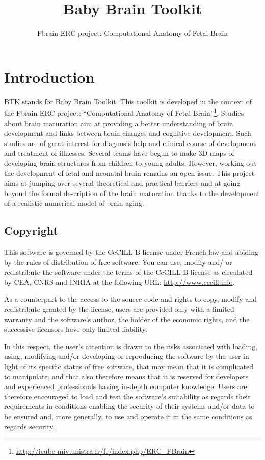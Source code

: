 \documentclass[a4paper,10pt]{article}
\title{Baby Brain Toolkit}
\author{Fbrain ERC project: Computational Anatomy of Fetal Brain}
\begin{document}
\maketitle
\tableofcontents
\setcounter{tocdepth}{5}
\setcounter{secnumdepth}{5}

\section{Introduction}

BTK stands for Baby Brain Toolkit. This toolkit is developed in the context of
the Fbrain ERC project: ``Computational Anatomy of Fetal
Brain''\footnote{\url{http://icube-miv.unistra.fr/fr/index.php/ERC\_FBrain}}. 
Studies about brain maturation aim at providing a better understanding of brain
development and links between brain changes and cognitive development. Such
studies are of great interest for diagnosis help and clinical course of
development and treatment of illnesses. Several teams have begun to make 3D maps
of developing brain structures from children to young adults. However, working
out the development of fetal and neonatal brain remains an open issue. This
project aims at jumping over several theoretical and practical barriers and at
going beyond the formal description of the brain maturation thanks to the
development of a realistic numerical model of brain aging.

\subsection{Copyright}
This software is governed by the CeCILL-B license under French law and
abiding by the rules of distribution of free software.  You can  use, 
modify and/ or redistribute the software under the terms of the CeCILL-B
license as circulated by CEA, CNRS and INRIA at the following URL: \url{http://www.cecill.info}. 

As a counterpart to the access to the source code and rights to copy,
modify and redistribute granted by the license, users are provided only
with a limited warranty  and the software's author,  the holder of the
economic rights,  and the successive licensors  have only  limited
liability. 

In this respect, the user's attention is drawn to the risks associated
with loading,  using,  modifying and/or developing or reproducing the
software by the user in light of its specific status of free software,
that may mean  that it is complicated to manipulate,  and  that  also
therefore means  that it is reserved for developers  and  experienced
professionals having in-depth computer knowledge. Users are therefore
encouraged to load and test the software's suitability as regards their
requirements in conditions enabling the security of their systems and/or 
data to be ensured and,  more generally, to use and operate it in the 
same conditions as regards security. 
\end{document}
